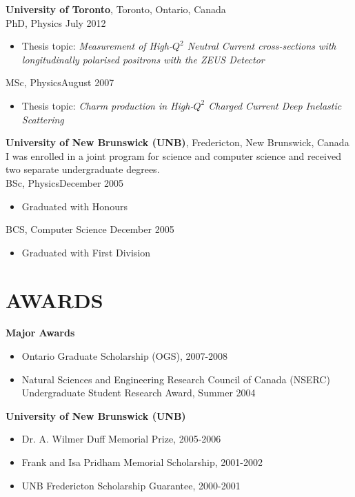 \documentclass[margin]{res}
\begin{document}
\begin{resume}
{\bf University of Toronto}, Toronto, Ontario, Canada \\
PhD, Physics \hfill July 2012
\begin{itemize} \itemsep -2pt  %
\item Thesis topic: \textit{Measurement of High-$Q^2$ Neutral Current cross-sections with longitudinally polarised positrons with the ZEUS Detector}
\end{itemize}

MSc, Physics\hfill August 2007 
\begin{itemize} \itemsep -2pt  %
\item Thesis topic: \textit{Charm production in High-$Q^2$ Charged Current Deep Inelastic Scattering}
\end{itemize}

{\bf University of New Brunswick (UNB)}, Fredericton, New Brunswick, Canada \\
I was enrolled in a joint program for science and computer science and received two separate undergraduate degrees.\\
BSc, Physics\hfill December 2005
\begin{itemize} \itemsep -2pt  %
\item Graduated with Honours 
\end{itemize}

BCS, Computer Science \hfill December 2005
\begin{itemize} \itemsep -2pt  %
\item Graduated with First Division 
\end{itemize}

\section{AWARDS}

\textbf{Major Awards}\\
\begin{itemize}
\item Ontario Graduate Scholarship (OGS), 2007-2008
\item Natural Sciences and Engineering Research Council of Canada (NSERC) Undergraduate Student Research Award, Summer 2004
\end{itemize}
\textbf{University of New Brunswick (UNB)}\\
\begin{itemize}
\item Dr. A. Wilmer Duff Memorial Prize, 2005-2006
\item Frank and  Isa  Pridham Memorial Scholarship, 2001-2002
\item UNB Fredericton Scholarship Guarantee, 2000-2001
\end{itemize}



\end{resume}
\end{document}
